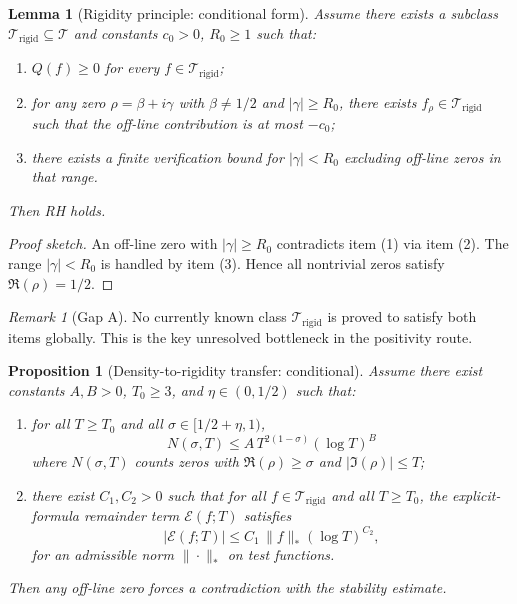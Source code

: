 \documentclass[11pt]{article}
\theoremstyle{plain}
\newtheorem{proposition}[theorem]{Proposition}
\newtheorem{lemma}[theorem]{Lemma}
\theoremstyle{definition}
\theoremstyle{remark}
\newtheorem{remark}[theorem]{Remark}
\begin{document}
\begin{lemma}[Rigidity principle: conditional form]
Assume there exists a subclass $\mathcal{T}_{\mathrm{rigid}}\subseteq\mathcal{T}$ and constants
$c_0>0$, $R_0\ge 1$ such that:
\begin{enumerate}
  \item $Q(f)\ge 0$ for every $f\in\mathcal{T}_{\mathrm{rigid}}$;
  \item for any zero $\rho=\beta+i\gamma$ with $\beta\ne 1/2$ and $|\gamma|\ge R_0$, there exists
  $f_\rho\in\mathcal{T}_{\mathrm{rigid}}$ such that the off-line contribution is at most $-c_0$;
  \item there exists a finite verification bound for $|\gamma|<R_0$ excluding off-line zeros in that range.
\end{enumerate}
Then RH holds.
\end{lemma}

\begin{proof}[Proof sketch]
An off-line zero with $|\gamma|\ge R_0$ contradicts item (1) via item (2). The range
$|\gamma|<R_0$ is handled by item (3). Hence all nontrivial zeros satisfy $\Re(\rho)=1/2$.
\end{proof}

\begin{remark}[Gap A]
No currently known class $\mathcal{T}_{\mathrm{rigid}}$ is proved to satisfy both items globally.
This is the key unresolved bottleneck in the positivity route.
\end{remark}

\begin{proposition}[Density-to-rigidity transfer: conditional]
Assume there exist constants $A,B>0$, $T_0\ge 3$, and $\eta\in(0,1/2)$ such that:
\begin{enumerate}
  \item for all $T\ge T_0$ and all $\sigma\in[1/2+\eta,1)$,
\[
N(\sigma,T) \le A\,T^{2(1-\sigma)}(\log T)^B
\]
  where $N(\sigma,T)$ counts zeros with $\Re(\rho)\ge\sigma$ and $|\Im(\rho)|\le T$;
  \item there exist $C_1,C_2>0$ such that for all $f\in\mathcal{T}_{\mathrm{rigid}}$ and all $T\ge T_0$,
  the explicit-formula remainder term $\mathcal{E}(f;T)$ satisfies
\[
|\mathcal{E}(f;T)| \le C_1\,\|f\|_{\ast}(\log T)^{C_2},
\]
  for an admissible norm $\|\cdot\|_{\ast}$ on test functions.
\end{enumerate}
Then any off-line zero forces a contradiction with the stability estimate.
\end{proposition}
\end{document}
